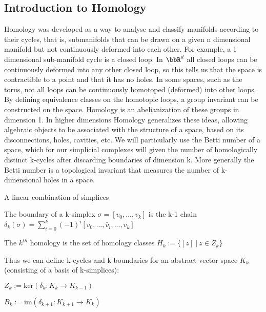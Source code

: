 \subsection{Introduction to Homology} 

Homology was developed as a way to analyse and classify manifolds according to their cycles, that is, submanifolds that can be drawn on a given n dimensional manifold but not continuously deformed into each other. For example, a 1 dimensional sub-manifold cycle is a closed loop. In $\bbR^d$ all closed loops can be continuously deformed into any other closed loop, so this tells us that the space is contractible to a point and that it has no holes. In some spaces, such as the torus, not all loops can be continuously homotoped (deformed) into other loops. By defining equivalence classes on the homotopic loops, a group invariant can be constructed on the space. Homology is an abelianization of these groups in dimension 1. In higher dimensions Homology generalizes these ideas, allowing algebraic objects to be associated with the structure of a space, based on its disconnections, holes, cavities, etc. We will particularly use the Betti number of a space, which for our simplicial complexes will given the number of homologically distinct k-cycles after discarding boundaries of dimension k. More generally the Betti number is a topological invariant that measures the number of k-dimensional holes in a space. 

\begin{definition}[k-chain]
A linear combination of simplices
\end{definition}

\begin{definition}
The boundary of a k-simplex $\sigma = [v_0, ..., v_k]$ is the k-1 chain $\delta_k(\sigma) = \sum_{i=0}^k (-1)^{i}[v_0, ..., \hat{v}_i, ..., v_k]$
\end{definition}

\begin{definition}
The $k^{th}$ homology is the set of homology classes $H_k := \{[z] \: | \: z\in Z_k\}$
\end{definition}

Thus we can define k-cycles and k-boundaries for an abstract vector space $K_k$ (consisting of a basis of k-simplices):

\begin{definition}[k-cycle]
$Z_k := \text{ker}(\delta_{k}:K_k \rightarrow K_{k-1})$
\end{definition}
\begin{definition}[k-boundaries]
$B_k := \text{im}(\delta_{k+1}:K_{k+1} \rightarrow K_{k})$
\end{definition}

